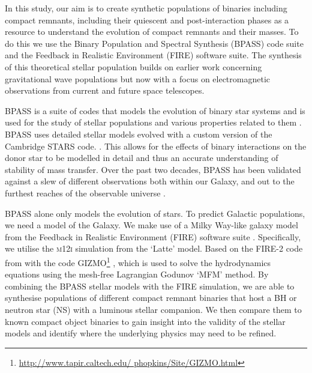 \documentclass{pas}
\begin{document}
In this study, our aim is to create synthetic populations of binaries including compact remnants, including their quiescent and post-interaction phases as a resource to understand the evolution of compact remnants and their masses. To do this we use the Binary Population and Spectral Synthesis (\textsc{BPASS}) code suite \citep{2017PASA...34...58E,se2018} and the Feedback in Realistic Environment (\textsc{FIRE}) \citep{2014MNRAS.445..581H} software suite. The synthesis of this theoretical stellar population builds on earlier work concerning gravitational wave populations \citep{tang2024predictinggravitationalwavesignals} but now with a focus on electromagnetic observations from current and future space telescopes.

\textsc{BPASS} is a suite of codes that models the evolution of binary star systems and is used for the study of stellar populations and various properties related to them \citep[see ][for details]{2017PASA...34...58E,se2018}. \textsc{BPASS} uses detailed stellar models evolved with a custom version of the Cambridge STARS code. \citep{Eldridge_2008, 2017PASA...34...58E}. This allows for the effects of binary interactions on the donor star to be modelled in detail and thus an accurate understanding of stability of mass transfer. Over the past two decades, \textsc{BPASS} has been validated against a slew of different observations both within our Galaxy, and out to the furthest reaches of the observable universe \citep[e.g.][and references therein]{2017PASA...34...58E,2022EldridgeStanway,Kobayashi_2023}.

\textsc{BPASS} alone only models the evolution of stars. To predict Galactic populations, we need a model of the Galaxy. We make use of a Milky Way-like galaxy model from the Feedback in Realistic Environment (FIRE) software suite \citep{2014MNRAS.445..581H}. Specifically, we utilise the \textsc{m12i}  simulation from the `Latte' model. \citep{2023ApJS..265...44W} Based on the \textsc{FIRE-2} code from \citet{2018MNRAS.480..800H} with the code \textsc{GIZMO}\footnote{\url{http://www.tapir.caltech.edu/ phopkins/Site/GIZMO.html}} \citep{2015MNRAS.450...53H}, which is used to solve the hydrodynamics equations using the mesh-free Lagrangian Godunov `MFM' method. By combining the \textsc{BPASS} stellar models with the \textsc{FIRE} simulation, we are able to synthesise populations of different compact remnant binaries that host a BH or neutron star (NS) with a luminous stellar companion. We then compare them to known compact object binaries to gain insight into the validity of the stellar models and identify where the underlying physics may need to be refined.
\end{document}
